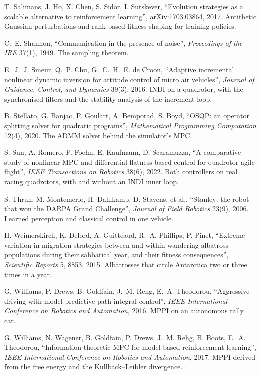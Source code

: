 \begin{description}[leftmargin=1.5em, itemindent=-1.5em, itemsep=5pt, font=\normalfont]
  \item[] T. Salimans, J. Ho, X. Chen, S. Sidor, I. Sutskever, \enquote{Evolution strategies as a scalable alternative to reinforcement learning}, arXiv:1703.03864, 2017. Antithetic Gaussian perturbations and rank-based fitness shaping for training policies.
  \item[] C.~E. Shannon, \enquote{Communication in the presence of noise}, \emph{Proceedings of the IRE} 37(1), 1949. The sampling theorem.
  \item[] E.~J.~J. Smeur, Q.~P. Chu, G.~C.~H.~E. de Croon, \enquote{Adaptive incremental nonlinear dynamic inversion for attitude control of micro air vehicles}, \emph{Journal of Guidance, Control, and Dynamics} 39(3), 2016. INDI on a quadrotor, with the synchronised filters and the stability analysis of the increment loop.
  \item[] B. Stellato, G. Banjac, P. Goulart, A. Bemporad, S. Boyd, \enquote{OSQP: an operator splitting solver for quadratic programs}, \emph{Mathematical Programming Computation} 12(4), 2020. The ADMM solver behind the simulator's MPC.
  \item[] S. Sun, A. Romero, P. Foehn, E. Kaufmann, D. Scaramuzza, \enquote{A comparative study of nonlinear MPC and differential-flatness-based control for quadrotor agile flight}, \emph{IEEE Transactions on Robotics} 38(6), 2022. Both controllers on real racing quadrotors, with and without an INDI inner loop.
  \item[] S. Thrun, M. Montemerlo, H. Dahlkamp, D. Stavens, et al., \enquote{Stanley: the robot that won the DARPA Grand Challenge}, \emph{Journal of Field Robotics} 23(9), 2006. Learned perception and classical control in one vehicle.
  \item[] H. Weimerskirch, K. Delord, A. Guitteaud, R.~A. Phillips, P. Pinet, \enquote{Extreme variation in migration strategies between and within wandering albatross populations during their sabbatical year, and their fitness consequences}, \emph{Scientific Reports} 5, 8853, 2015. Albatrosses that circle Antarctica two or three times in a year.
  \item[] G. Williams, P. Drews, B. Goldfain, J.~M. Rehg, E.~A. Theodorou, \enquote{Aggressive driving with model predictive path integral control}, \emph{IEEE International Conference on Robotics and Automation}, 2016. MPPI on an autonomous rally car.
  \item[] G. Williams, N. Wagener, B. Goldfain, P. Drews, J.~M. Rehg, B. Boots, E.~A. Theodorou, \enquote{Information theoretic MPC for model-based reinforcement learning}, \emph{IEEE International Conference on Robotics and Automation}, 2017. MPPI derived from the free energy and the Kullback--Leibler divergence.

\end{description}
